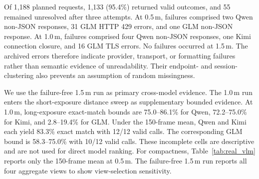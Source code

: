 \documentclass{ieeeaccess}
\begin{document}
Of 1,188 planned requests, 1,133 (95.4\%) returned valid outcomes, and 55 remained unresolved after three attempts. At 0.5\,m, failures comprised two Qwen non-JSON responses, 31 GLM HTTP 429 errors, and one GLM non-JSON response. At 1.0\,m, failures comprised four Qwen non-JSON responses, one Kimi connection closure, and 16 GLM TLS errors. No failures occurred at 1.5\,m. The archived errors therefore indicate provider, transport, or formatting failures rather than semantic evidence of unreadability. Their endpoint- and session-clustering also prevents an assumption of random missingness.

We use the failure-free 1.5\,m run as primary cross-model evidence. The 1.0\,m run enters the short-exposure distance sweep as supplementary bounded evidence. At 1.0\,m, long-exposure exact-match bounds are 75.0--86.1\% for Qwen, 72.2--75.0\% for Kimi, and 2.8--19.4\% for GLM. Under the 150-frame mean, Qwen and Kimi each yield 83.3\% exact match with 12/12 valid calls. The corresponding GLM bound is 58.3--75.0\% with 10/12 valid calls. These incomplete cells are descriptive and are not used for direct model ranking. For compactness, Table~\ref{tab:real_vlm} reports only the 150-frame mean at 0.5\,m. The failure-free 1.5\,m run reports all four aggregate views to show view-selection sensitivity.
\end{document}
